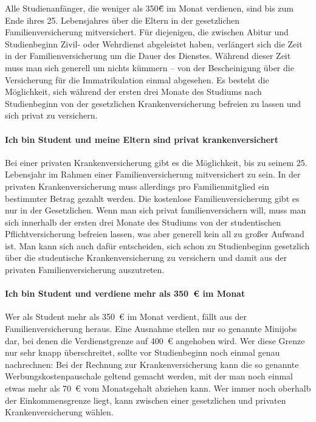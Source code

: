 \documentclass[twoside,12pt,parskip=half-]{scrartcl}
\begin{document}
Alle Studienanfänger, die weniger als 350\~€ im Monat verdienen, sind
bis zum Ende ihres 25. Lebensjahres über die Eltern in der
gesetzlichen Familienversicherung mitversichert. Für diejenigen, die
zwischen Abitur und Studienbeginn Zivil- oder Wehrdienst abgeleistet
haben, verlängert sich die Zeit in der Familienversicherung um die
Dauer des Dienstes. Während dieser Zeit muss man sich generell um
nichts kümmern – von der Bescheinigung über die Versicherung für die
Immatrikulation einmal abgesehen. Es besteht die Möglichkeit, sich
während der ersten drei Monate des Studiums nach Studienbeginn von der
gesetzlichen Krankenversicherung befreien zu lassen und sich privat zu
versichern.

\paragraph{Ich bin Student und meine Eltern sind privat krankenversichert}

Bei einer privaten Krankenversicherung gibt es die Möglichkeit, bis zu
seinem 25. Lebensjahr im Rahmen einer Familienversicherung
mitversichert zu sein. In der privaten Krankenversicherung muss
allerdings pro Familienmitglied ein bestimmter Betrag gezahlt
werden. Die kostenlose Familienversicherung gibt es nur in der
Gesetzlichen. Wenn man sich privat familienversichern will, muss man
sich innerhalb der ersten drei Monate des Studiums von der
studentischen Pflichtversicherung befreien lassen, was aber generell
kein all zu großer Aufwand ist. Man kann sich auch dafür entscheiden,
sich schon zu Studienbeginn gesetzlich über die studentische
Krankenversicherung zu versichern und damit aus der privaten
Familienversicherung auszutreten.

\paragraph{Ich bin Student und verdiene mehr als 350~€ im Monat}

Wer als Student mehr als 350~€ im Monat verdient, fällt aus der
Familienversicherung heraus. Eine Ausnahme stellen nur so genannte
Minijobs dar, bei denen die Verdienstgrenze auf 400~€ angehoben
wird. Wer diese Grenze nur sehr knapp überschreitet, sollte vor
Studienbeginn noch einmal genau nachrechnen: Bei der Rechnung zur
Krankenversicherung kann die so genannte Werbungskostenpauschale
geltend gemacht werden, mit der man noch einmal etwas mehr als 70~€
vom Monatsgehalt abziehen kann. Wer immer noch oberhalb der
Einkommensgrenze liegt, kann zwischen einer gesetzlichen und privaten
Krankenversicherung wählen.
\end{document}
